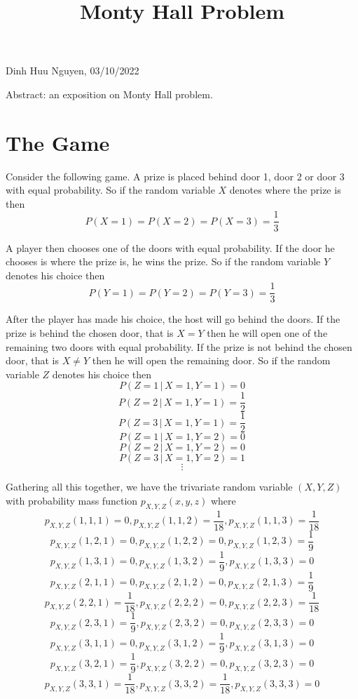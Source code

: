 \documentclass[11pt]{amsart}
\title{Monty Hall Problem}
\theoremstyle{definition}
\begin{document}
\maketitle

\begin{center}
Dinh Huu Nguyen, 03/10/2022
\end{center}
\vspace{20pt}

Abstract: an exposition on Monty Hall problem.

\tableofcontents

\section{The Game}
Consider the following game. A prize is placed behind door 1, door 2 or door 3 with equal probability. So if the random variable $X$ denotes where the prize is then
$$P(X = 1) = P(X = 2) = P(X = 3) = \frac{1}{3}$$

A player then chooses one of the doors with equal probability. If the door he chooses is where the prize is, he wins the prize. So if the random variable $Y$ denotes his choice then
$$P(Y = 1) = P(Y = 2) = P(Y = 3) = \frac{1}{3}$$

After the player has made his choice, the host will go behind the doors. If the prize is behind the chosen door, that is $X = Y$ then he will open one of the remaining two doors with equal probability. If the prize is not behind the chosen door, that is $X \neq Y$ then he will open the remaining door. So if the random variable $Z$ denotes his choice then
$$P(Z = 1 \,|\, X = 1, Y = 1) = 0$$
$$P(Z = 2 \,|\, X = 1, Y = 1) = \frac{1}{2}$$
$$P(Z = 3 \,|\, X = 1, Y = 1) = \frac{1}{2}$$
$$P(Z = 1 \,|\, X = 1, Y = 2) = 0$$
$$P(Z = 2 \,|\, X = 1, Y = 2) = 0$$
$$P(Z = 3 \,|\, X = 1, Y = 2) = 1$$
$$\vdots$$

Gathering all this together, we have the trivariate random variable $(X,Y,Z)$ with probability mass function $p_{X,Y,Z}(x, y, z)$ where
$$p_{X,Y,Z}(1,1,1) = 0, p_{X,Y,Z}(1,1,2) = \frac{1}{18}, p_{X,Y,Z}(1,1,3) = \frac{1}{18}$$
$$p_{X,Y,Z}(1,2,1) = 0, p_{X,Y,Z}(1,2,2) = 0, p_{X,Y,Z}(1,2,3) = \frac{1}{9}$$
$$p_{X,Y,Z}(1,3,1) = 0, p_{X,Y,Z}(1,3,2) = \frac{1}{9}, p_{X,Y,Z}(1,3,3) = 0$$
$$p_{X,Y,Z}(2,1,1) = 0, p_{X,Y,Z}(2,1,2) = 0, p_{X,Y,Z}(2,1,3) = \frac{1}{9}$$
$$p_{X,Y,Z}(2,2,1) = \frac{1}{18}, p_{X,Y,Z}(2,2,2) = 0, p_{X,Y,Z}(2,2,3) = \frac{1}{18}$$
$$p_{X,Y,Z}(2,3,1) = \frac{1}{9}, p_{X,Y,Z}(2,3,2) = 0, p_{X,Y,Z}(2,3,3) = 0$$
$$p_{X,Y,Z}(3,1,1) = 0, p_{X,Y,Z}(3,1,2) = \frac{1}{9}, p_{X,Y,Z}(3,1,3) = 0$$
$$p_{X,Y,Z}(3,2,1) = \frac{1}{9}, p_{X,Y,Z}(3,2,2) = 0, p_{X,Y,Z}(3,2,3) = 0$$
$$p_{X,Y,Z}(3,3,1) = \frac{1}{18}, p_{X,Y,Z}(3,3,2) = \frac{1}{18}, p_{X,Y,Z}(3,3,3) = 0$$
\end{document}
